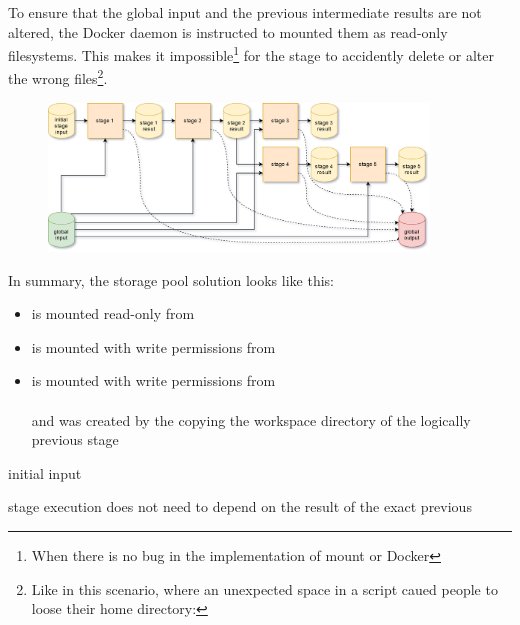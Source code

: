 To ensure that the global input and the previous intermediate results are not altered, the Docker daemon is instructed to mounted them as read-only filesystems.
This makes it impossible\footnote{When there is no bug in the implementation of mount or Docker} for the stage to accidently delete or alter the wrong files\footnote{Like in this scenario, where an unexpected space in a script caued people to loose their home directory: }.


\begin{figure}[H]
	\centering
	\includegraphics[width=0.9\textwidth]{stage-storage.png}
\end{figure}

In summary, the storage pool solution looks like this:

\begin{itemize}
	\item {} is mounted read-only from \\ 
	\item {} is mounted with write permissions from \\ 
	\item {} is mounted with write permissions from \\  \\
	and was created by the copying the workspace directory of the logically previous stage
\end{itemize}




initial input

stage execution does not need to depend on the result of the exact previous



